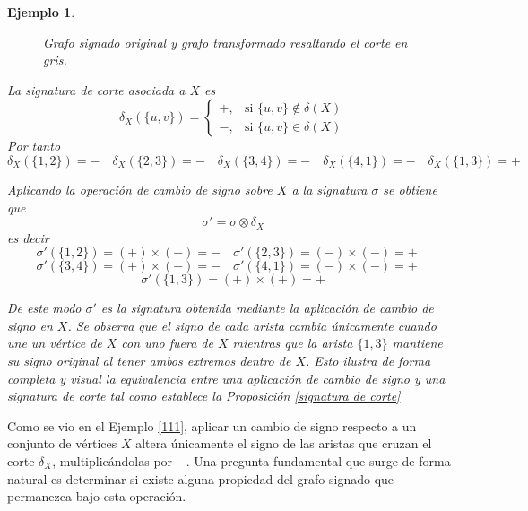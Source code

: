 \documentclass[11pt,a4paper,spanish]{report}
\theoremstyle{plain}
\newtheorem{ejemplo}{Ejemplo}[chapter]
\begin{document}
\begin{ejemplo}
\begin{figure}[H]
\begin{center}
\end{center}
    \caption{{Grafo signado original y grafo transformado resaltando el corte en gris}.}
    \label{ejcort}
\end{figure}

 
La signatura de corte asociada a $X$ es
\[
\delta_X(\{u,v\})=
\begin{cases}
+, & \text{si } \{u,v\}\notin \delta(X)\\
-, & \text{si } \{u,v\}  \in \delta(X)
\end{cases}
\]
Por tanto
\[
\delta_X(\{1,2\}) = - \quad
\delta_X(\{2,3\}) = - \quad
\delta_X(\{3,4\}) = - \quad
\delta_X(\{4,1\}) = - \quad
\delta_X(\{1,3\}) = +
\]

Aplicando la operación de cambio de signo sobre $X$ a la signatura $\sigma$ se obtiene que
\[
\sigma' = \sigma \otimes \delta_X
\]
es decir
\[
\sigma'(\{1,2\}) = (+)\times(-) = - \quad
\sigma'(\{2,3\}) = (-)\times(-) = + \quad
\]
\[
\sigma'(\{3,4\}) = (+)\times(-) = - \quad
\sigma'(\{4,1\}) = (-)\times(-) = + \quad
\]
\[
\sigma'(\{1,3\}) = (+)\times(+) = +
\]

De este modo $\sigma'$ es la signatura obtenida mediante la aplicación de cambio de signo en $X$.  
Se observa que el signo de cada arista cambia únicamente cuando une un vértice de $X$ con uno fuera de $X$ mientras que la arista $\{1,3\}$ mantiene su signo original al tener ambos extremos dentro de $X$. Esto ilustra de forma completa y visual la equivalencia entre una aplicación de cambio de signo y una signatura de corte tal como establece la Proposición \ref{signatura de corte}
\end{ejemplo}





Como se vio en el Ejemplo \ref{111}, aplicar un cambio de signo respecto a un conjunto de vértices $X$ altera únicamente el signo de las aristas que cruzan el corte $\delta_X$, multiplicándolas por $-$. Una pregunta fundamental que surge de forma natural es determinar si existe alguna propiedad del grafo signado que permanezca bajo esta operación. 
\end{document}
